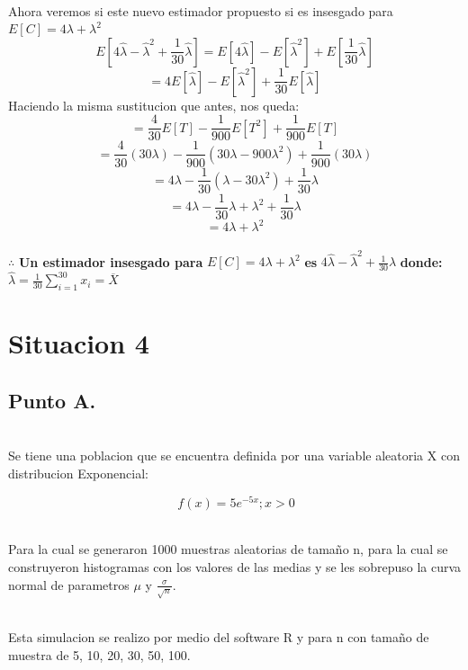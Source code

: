 \documentclass[letterpaper,12pt,onecolumn,titlepage]{article}
\begin{document}
~\\ Ahora veremos si este nuevo estimador propuesto si es insesgado para $E[C] = 4\lambda + {\lambda}^2$
$$E[4\hat{\lambda}-\hat{\lambda}^2+\frac{1}{30}\hat{\lambda}]=E[4\hat{\lambda}]-E[\hat{\lambda}^2]+E[\frac{1}{30}\hat{\lambda}]$$
$$=4E[\hat{\lambda}]-E[\hat{\lambda}^2]+\frac{1}{30}E[\hat{\lambda}]$$
Haciendo la misma sustitucion que antes, nos queda:
$$=\frac{4}{30}E[T]-\frac{1}{900}E[T^2]+\frac{1}{900}E[T]$$
$$=\frac{4}{30}(30\lambda)-\frac{1}{900}(30\lambda-900{\lambda}^2)+\frac{1}{900}(30\lambda)$$
$$=4\lambda-\frac{1}{30}(\lambda-30{\lambda}^2)+\frac{1}{30}\lambda$$
$$=4\lambda-\frac{1}{30}\lambda+{\lambda}^2+\frac{1}{30}\lambda$$
$$=4\lambda+{\lambda}^2$$
~\\$\therefore$ \textbf{Un estimador insesgado para} $E[C]=4\lambda+{\lambda}^2$ \textbf{es} $4\hat{\lambda}-\hat{\lambda}^2+\frac{1}{30}\hat{\lambda}$ \textbf{donde:} $\hat{\lambda}=\frac{1}{30} \sum_{i=1}^{30}x_{i} = \overline{X}$

\pagebreak\section{Situacion 4}
\subsection{Punto A.}
~\\Se tiene una poblacion que se encuentra definida por una variable aleatoria X con distribucion Exponencial:

$$\ f(x)=5e^{-5x} ; x>0$$

~\\ Para la cual se generaron 1000 muestras aleatorias de tama\~{n}o n, para la cual se construyeron histogramas con los valores de las medias y se les sobrepuso la curva normal de parametros $\mu$ y $\frac{\sigma}{\sqrt{n}}$. 

~\\ Esta simulacion se realizo por medio del software R y para n con tama\~{n}o de muestra de 5, 10, 20, 30, 50, 100.
\end{document}
